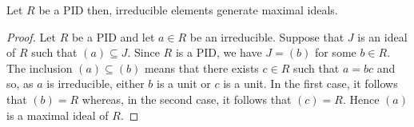 \documentclass[12pt, a4paper]{article}
\begin{document}
\begin{mdcor}
    Let \(R\) be a PID then, irreducible elements generate maximal ideals.
\end{mdcor}

\begin{proof}
    Let \( R \) be a PID and let \( a \in R \) be an irreducible. Suppose that \( J \) is an ideal of \( R \) such that \( (a) \subseteq J \). Since \( R \) is a PID, we have \( J = (b) \) for some \( b \in R \). The inclusion \( (a) \subseteq (b) \) means that there exists \( c \in R \) such that \( a = bc \) and so, as \( a \) is irreducible, either \( b \) is a unit or \( c \) is a unit. In the first case, it follows that \( (b) = R \) whereas, in the second case, it follows that \( (c) = R \). Hence \( (a) \) is a maximal ideal of \( R \).
\end{proof}
\end{document}
